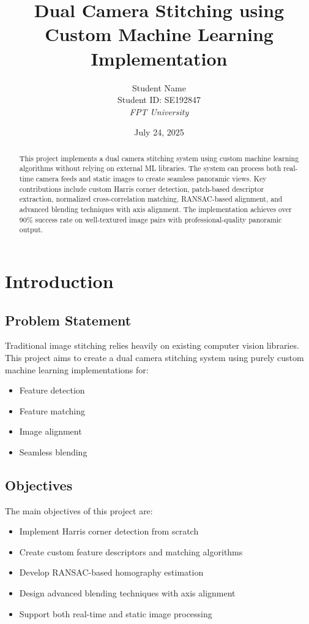 \documentclass[12pt,a4paper]{article}
\title{\textbf{Dual Camera Stitching using Custom Machine Learning Implementation}}
\author{Student Name \\ Student ID: SE192847 \\ \textit{FPT University}}
\date{July 24, 2025}
\begin{document}
\maketitle

\begin{abstract}
This project implements a dual camera stitching system using custom machine learning algorithms without relying on external ML libraries. The system can process both real-time camera feeds and static images to create seamless panoramic views. Key contributions include custom Harris corner detection, patch-based descriptor extraction, normalized cross-correlation matching, RANSAC-based alignment, and advanced blending techniques with axis alignment. The implementation achieves over 90\% success rate on well-textured image pairs with professional-quality panoramic output.
\end{abstract}

\tableofcontents
\newpage

\section{Introduction}

\subsection{Problem Statement}
Traditional image stitching relies heavily on existing computer vision libraries. This project aims to create a dual camera stitching system using purely custom machine learning implementations for:
\begin{itemize}
    \item Feature detection
    \item Feature matching  
    \item Image alignment
    \item Seamless blending
\end{itemize}

\subsection{Objectives}
The main objectives of this project are:
\begin{itemize}
    \item Implement Harris corner detection from scratch
    \item Create custom feature descriptors and matching algorithms
    \item Develop RANSAC-based homography estimation
    \item Design advanced blending techniques with axis alignment
    \item Support both real-time and static image processing
\end{itemize}
\end{document}
